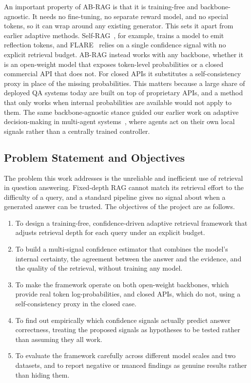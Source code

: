 \documentclass[conference,a4paper,10pt]{IEEEtran}
\begin{document}
An important property of AB-RAG is that it is training-free and backbone-agnostic. It
needs no fine-tuning, no separate reward model, and no special tokens, so it can wrap
around any existing generator. This sets it apart from earlier adaptive methods.
Self-RAG~\cite{asai2024selfrag}, for example, trains a model to emit reflection tokens,
and FLARE~\cite{jiang2023flare} relies on a single confidence signal with no explicit
retrieval budget. AB-RAG instead works with any backbone, whether it is an open-weight
model that exposes token-level probabilities or a closed commercial API that does not.
For closed APIs it substitutes a self-consistency proxy in place of the missing
probabilities. This matters because a large share of deployed QA systems today are built
on top of proprietary APIs, and a method that only works when internal probabilities are
available would not apply to them. The same backbone-agnostic stance guided our earlier
work on adaptive decision-making in multi-agent systems~\cite{kamthan2025marl}, where
agents act on their own local signals rather than a centrally trained controller.

\subsection{Problem Statement and Objectives}
The problem this work addresses is the unreliable and inefficient use of retrieval in
question answering. Fixed-depth RAG cannot match its retrieval effort to the difficulty
of a query, and a standard pipeline gives no signal about when a generated answer can be
trusted. The objectives of the project are as follows.
\begin{enumerate}
\item To design a training-free, confidence-driven adaptive retrieval framework that
adjusts retrieval depth for each query under an explicit budget.
\item To build a multi-signal confidence estimator that combines the model's internal
certainty, the agreement between the answer and the evidence, and the quality of the
retrieval, without training any model.
\item To make the framework operate on both open-weight backbones, which provide real
token log-probabilities, and closed APIs, which do not, using a self-consistency proxy
in the closed case.
\item To find out empirically which confidence signals actually predict answer
correctness, treating the proposed signals as hypotheses to be tested rather than
assuming they all work.
\item To evaluate the framework carefully across different model scales and two
datasets, and to report negative or nuanced findings as genuine results rather than
hiding them.
\end{enumerate}
\end{document}

